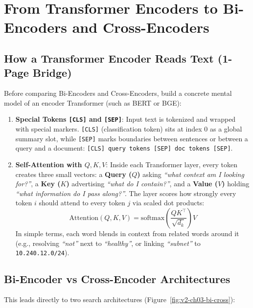 \section{From Transformer Encoders to Bi-Encoders and Cross-Encoders}

\subsection{How a Transformer Encoder Reads Text (1-Page Bridge)}
Before comparing Bi-Encoders and Cross-Encoders, build a concrete mental model of an encoder Transformer (such as BERT or BGE):
\begin{enumerate}[leftmargin=18pt]
  \item \textbf{Special Tokens \texttt{[CLS]} and \texttt{[SEP]}}: Input text is tokenized and wrapped with special markers. \texttt{[CLS]} (classification token) sits at index 0 as a global summary slot, while \texttt{[SEP]} marks boundaries between sentences or between a query and a document: \texttt{[CLS] query tokens [SEP] doc tokens [SEP]}.
  \item \textbf{Self-Attention with $Q, K, V$}: Inside each Transformer layer, every token creates three small vectors: a \textbf{Query ($Q$)} asking \emph{``what context am I looking for?''}, a \textbf{Key ($K$)} advertising \emph{``what do I contain?''}, and a \textbf{Value ($V$)} holding \emph{``what information do I pass along?''}. The layer scores how strongly every token $i$ should attend to every token $j$ via scaled dot products:
  \begin{equation}
  \text{Attention}(Q, K, V) = \text{softmax}\!\left(\frac{QK^\top}{\sqrt{d_k}}\right) V
  \end{equation}
  In simple terms, each word blends in context from related words around it (e.g., resolving \emph{``not''} next to \emph{``healthy''}, or linking \emph{``subnet''} to \texttt{10.240.12.0/24}).
\end{enumerate}

\subsection{Bi-Encoder vs Cross-Encoder Architectures}
This leads directly to two search architectures (Figure~\ref{fig:v2-ch03-bi-cross}):

